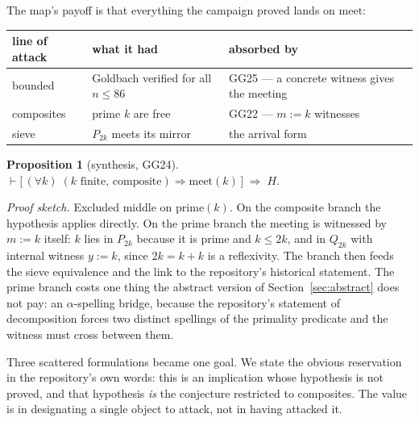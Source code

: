 \documentclass[11pt]{article}
\newtheorem{proposition}{Proposition}
\theoremstyle{remark}\newtheorem{remark}{Remark}
\begin{document}
The map's payoff is that everything the campaign proved lands on $\mathrm{meet}$:

\begin{center}
\begin{tabular}{@{}lll@{}}
\toprule
line of attack & what it had & absorbed by \\
\midrule
bounded & Goldbach verified for all $n \le 86$ & GG25 --- a concrete witness gives the meeting \\
composites & prime $k$ are free & GG22 --- $m := k$ witnesses \\
sieve & $P_{2k}$ meets its mirror & the arrival form \\
\bottomrule
\end{tabular}
\end{center}

\begin{proposition}[synthesis, GG24]
$\vdash \bigl[\,(\forall k)\;(\text{$k$ finite, composite}) \Rightarrow \mathrm{meet}(k)\,\bigr]
\;\Longrightarrow\; H .$
\end{proposition}

\emph{Proof sketch.} Excluded middle on $\mathrm{prime}(k)$. On the composite branch the
hypothesis applies directly. On the prime branch the meeting is witnessed by $m := k$
itself: $k$ lies in $P_{2k}$ because it is prime and $k \le 2k$, and in $Q_{2k}$ with
internal witness $y := k$, since $2k = k + k$ is a reflexivity. The branch then feeds
the sieve equivalence and the link to the repository's historical statement. The prime
branch costs one thing the abstract version of Section~\ref{sec:abstract} does not pay:
an $\alpha$-spelling bridge, because the repository's statement of decomposition forces
two distinct spellings of the primality predicate and the witness must cross between
them.

Three scattered formulations became one goal. We state the obvious reservation in the
repository's own words: this is an implication whose hypothesis is not proved, and that
hypothesis \emph{is} the conjecture restricted to composites. The value is in
designating a single object to attack, not in having attacked it.
\end{document}
